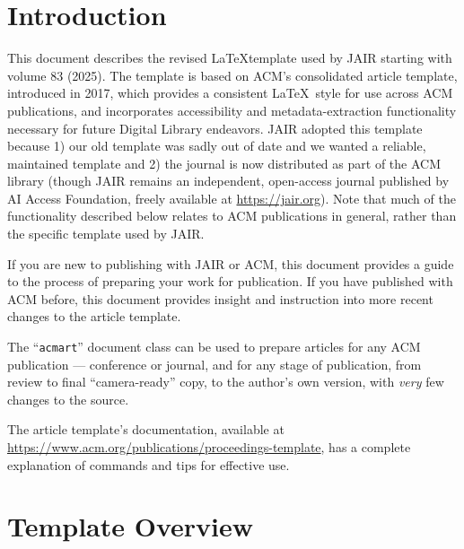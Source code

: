 \documentclass[]{jair}
\begin{document}



\maketitle

\section{Introduction}
This document describes the revised \LaTeX template used by JAIR starting with volume 83 (2025). The template is based on ACM's consolidated article template, introduced in 2017, which provides a
consistent \LaTeX\ style for use across ACM publications, and
incorporates accessibility and metadata-extraction functionality
necessary for future Digital Library endeavors. JAIR adopted this template because 1) our old template was sadly out of date and we wanted a reliable, maintained template and 2) the journal is now distributed as part of the ACM library (though JAIR remains an independent, open-access journal published by AI Access Foundation, freely available at \url{https://jair.org}). Note that much of the functionality described below relates to ACM publications in general, rather than the specific template used by JAIR.

If you are new to publishing with JAIR or ACM, this document provides a
guide to the process of preparing your work for publication. If you
have published with ACM before, this document provides insight and
instruction into more recent changes to the article template.

The ``\verb|acmart|'' document class can be used to prepare articles
for any ACM publication --- conference or journal, and for any stage
of publication, from review to final ``camera-ready'' copy, to the
author's own version, with {\itshape very} few changes to the source.

The article template's documentation, available at
\url{https://www.acm.org/publications/proceedings-template}, has a
complete explanation of commands and tips for effective
use.

\section{Template Overview}
\end{document}
